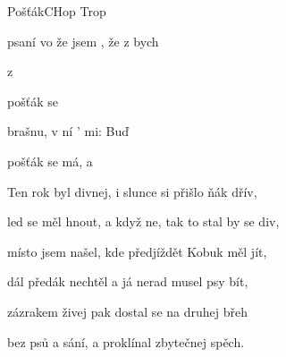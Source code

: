 \begin{song}{Pošťák}{C}{Hop Trop}
\begin{SBVerse}

psaní vo  že jsem , že z  bych 

z 

pošťák se 


brašnu, v ní ' mi: Buď 
\end{SBVerse}
\begin{SBChorus}


pošťák se má, a 

  \end{SBChorus}
\begin{SBVerse}
Ten rok byl divnej, i slunce si přišlo ňák dřív,

led se měl hnout, a když ne, tak to stal by se div,

místo jsem našel, kde předjíždět Kobuk měl jít,

dál předák nechtěl a já nerad musel psy bít,

zázrakem živej pak dostal se na druhej břeh

bez psů a sání, a proklínal zbytečnej spěch.
\end{SBVerse}
\end{song}

\pagebreak
